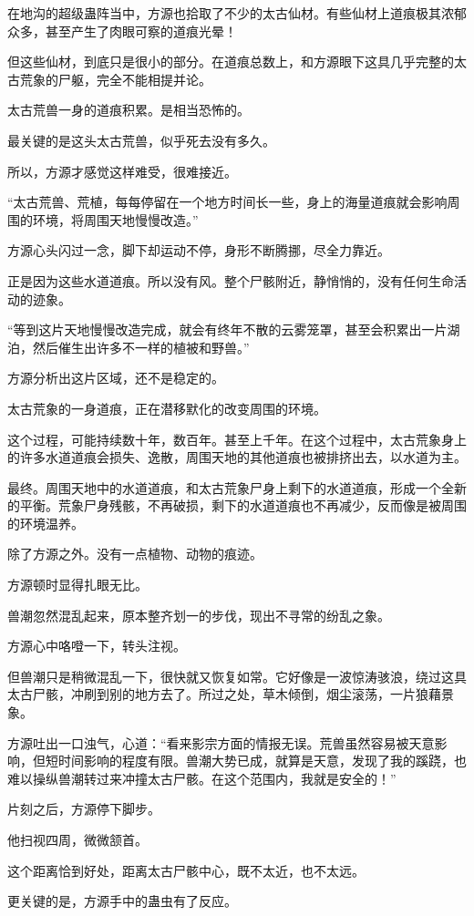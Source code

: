 \begin{this_body}
在地沟的超级蛊阵当中，方源也拾取了不少的太古仙材。有些仙材上道痕极其浓郁众多，甚至产生了肉眼可察的道痕光晕！

但这些仙材，到底只是很小的部分。在道痕总数上，和方源眼下这具几乎完整的太古荒象的尸躯，完全不能相提并论。

太古荒兽一身的道痕积累。是相当恐怖的。

最关键的是这头太古荒兽，似乎死去没有多久。

所以，方源才感觉这样难受，很难接近。

“太古荒兽、荒植，每每停留在一个地方时间长一些，身上的海量道痕就会影响周围的环境，将周围天地慢慢改造。”

方源心头闪过一念，脚下却运动不停，身形不断腾挪，尽全力靠近。

正是因为这些水道道痕。所以没有风。整个尸骸附近，静悄悄的，没有任何生命活动的迹象。

“等到这片天地慢慢改造完成，就会有终年不散的云雾笼罩，甚至会积累出一片湖泊，然后催生出许多不一样的植被和野兽。”

方源分析出这片区域，还不是稳定的。

太古荒象的一身道痕，正在潜移默化的改变周围的环境。

这个过程，可能持续数十年，数百年。甚至上千年。在这个过程中，太古荒象身上的许多水道道痕会损失、逸散，周围天地的其他道痕也被排挤出去，以水道为主。

最终。周围天地中的水道道痕，和太古荒象尸身上剩下的水道道痕，形成一个全新的平衡。荒象尸身残骸，不再破损，剩下的水道道痕也不再减少，反而像是被周围的环境温养。

除了方源之外。没有一点植物、动物的痕迹。

方源顿时显得扎眼无比。

兽潮忽然混乱起来，原本整齐划一的步伐，现出不寻常的纷乱之象。

方源心中咯噔一下，转头注视。

但兽潮只是稍微混乱一下，很快就又恢复如常。它好像是一波惊涛骇浪，绕过这具太古尸骸，冲刷到别的地方去了。所过之处，草木倾倒，烟尘滚荡，一片狼藉景象。

方源吐出一口浊气，心道：“看来影宗方面的情报无误。荒兽虽然容易被天意影响，但短时间影响的程度有限。兽潮大势已成，就算是天意，发现了我的蹊跷，也难以操纵兽潮转过来冲撞太古尸骸。在这个范围内，我就是安全的！”

片刻之后，方源停下脚步。

他扫视四周，微微颔首。

这个距离恰到好处，距离太古尸骸中心，既不太近，也不太远。

更关键的是，方源手中的蛊虫有了反应。


\end{this_body}

